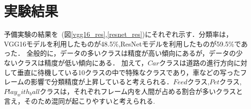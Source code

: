 \documentclass[twocolumn, a4paper]{UECIEresume}
\begin{document}
\section{実験結果}
予備実験の結果を~(図\ref{vgg16_res},\ref{resnet_res})にそれぞれ示す．分類率は，VGG16モデルを利用したものが48.5\%,ResNetモデルを利用したものが59.5\%であった．
全般的に，データの多いクラスは精度が高い傾向にあるが，データの少ないクラスは精度が低い傾向にある．
加えて，\(Car\)クラスは道路の進行方向に対して垂直に待機している10クラスの中で特殊なクラスであり，車などの写ったフレームの影響で分類精度が上昇していると考えられる．\(Feed\)クラス,\(Pet\)クラス,\(Play_with_ball\)クラスは，それぞれフレーム内を人間が占める割合が多いクラスと言え，そのため混同が起こりやすいと考えられる.

\end{document}
